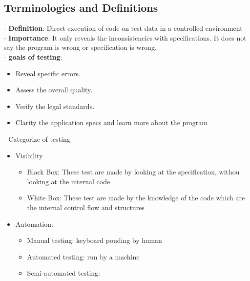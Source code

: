 \documentclass{article}
\begin{document}
  \subsection{ Terminologies and Definitions}
  -\textbf{ Definition}: Direct execution of code on test data in a controlled
  environment\\
  - \textbf{Importance}: It only reveals the inconsistencies with
  specifications. It does not say the program is wrong or specification is
  wrong. \\
  - \textbf{goals of testing}:\\
  \begin{itemize}
    \item Reveal specific errors.
    \item Assess the overall quality.
    \item Verify the legal standards.
    \item Clarity the application specs and learn more about the program
  \end{itemize}
  - Categorize of testing
  \begin{itemize}
    \item Visibility
    \begin{itemize}
      \item Black Box: These test are made by looking at the specification,
      withou looking at the internal code
      \item White Box: These test are made by the knowledge of the code which
      are the internal control flow and structures
      \end{itemize}
    \item Automation:
    \begin{itemize} 
      \item Manual testing: keyboard pouding by human
      \item Automated testing: run by a machine
      \item Semi-automated testing:
      \end{itemize}
  \end{itemize}
  
\end{document}
